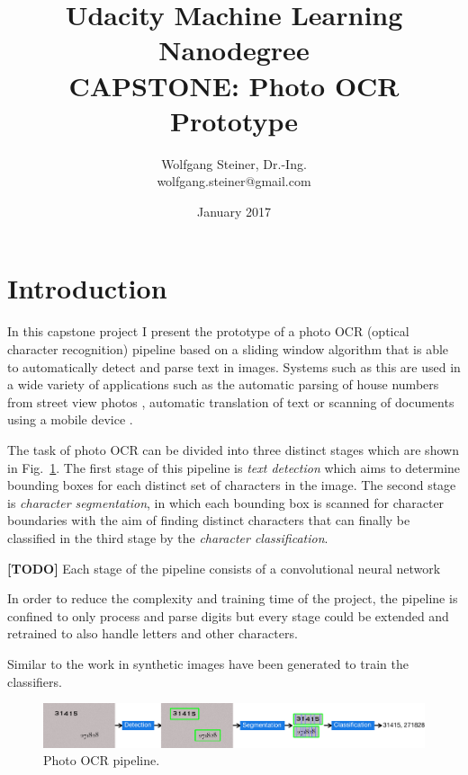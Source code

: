 \documentclass[11pt]{article}
\title{Udacity Machine Learning Nanodegree\\ CAPSTONE: Photo OCR Prototype}
\author{Wolfgang Steiner, Dr.-Ing. \\ \small{wolfgang.steiner@gmail.com}}
\date{January 2017}
\newcommand\figref[1]{Fig.~\ref{fig:#1}}
\begin{document}
\maketitle
\section{Introduction}
In this capstone project I present the prototype of a photo OCR (optical character recognition)
pipeline based on a sliding window algorithm that is able to automatically detect and parse
text in images. Systems such as this are used in a wide variety of applications
such as the automatic parsing of house numbers from street view photos \cite{Goodfellow2013},
automatic translation of text \cite{} or scanning of documents using a mobile device \cite{}.

The task of photo OCR can be divided into three distinct stages which are shown in \figref{pipeline}.
The first stage of this pipeline is \emph{text detection} which aims to determine bounding boxes for each
distinct set of characters in the image. The second stage is \emph{character segmentation}, in which
each bounding box is scanned for character boundaries with the aim of finding distinct characters
that can finally be classified in the third stage by the \emph{character classification}.

{\bf[TODO]}
Each stage of the pipeline consists of a convolutional neural network

In order to reduce the complexity and training time of the project, the pipeline is confined to
only process and parse digits but every stage could be extended and retrained to also handle letters
and other characters.

Similar to the work in \cite{Jaderberg2016} synthetic images have been generated to train the classifiers.


\begin{figure}[ht]
    \centering
    \includegraphics[scale=0.8]{fig/Pipeline}
    \caption{Photo OCR pipeline.}
    \label{fig:pipeline}
\end{figure}
\end{document}
